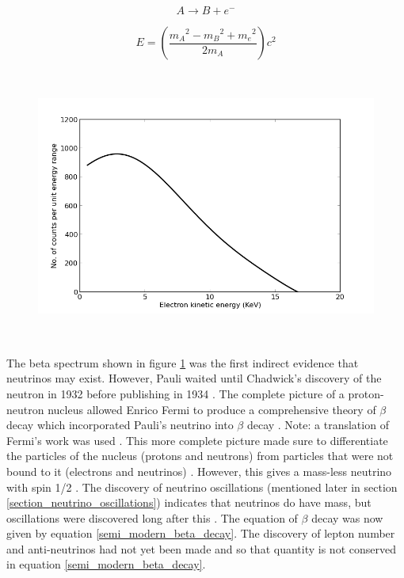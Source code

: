 \begin{equation}
    A \rightarrow B + e^-
    \label{oldBetaDecay}
\end{equation}

\begin{equation}
    E = \left( \frac{{m_A}^2 - {m_B}^2 + {m_e}^2}{2m_A}\right) c^2
    \label{constant_ke_e_equation}
\end{equation}

\begin{figure}[htbp]
 \centering
 \includegraphics[height=90mm]{Chapter1/Figs/Raster/beta_spectrum.png}
 \label{fig:beta_spectrum}
\end{figure}

The beta spectrum shown in figure \ref{fig:beta_spectrum} was the first indirect evidence that neutrinos may exist. However, Pauli waited until Chadwick's discovery of the neutron in 1932 \cite{chadwick1932possible} before publishing in 1934 \cite{lederman1970resource}. The complete picture of a proton-neutron nucleus allowed Enrico Fermi to produce a comprehensive theory of $\beta$ decay which incorporated Pauli's neutrino into $\beta$ decay \cite{lederman1970resource} \cite{Fermi:1934hr}. Note: a translation of Fermi's work was used \cite{wilson1968fermi}. This more complete picture made sure to differentiate the particles of the nucleus (protons and neutrons) from particles that were not bound to it (electrons and neutrinos) \cite{Fermi:1934hr} \cite{wilson1968fermi}. However, this gives a mass-less neutrino with spin 1/2 \cite{lederman1970resource}. The discovery of neutrino oscillations (mentioned later in section \ref{section_neutrino_oscillations}) indicates that neutrinos do have mass, but oscillations were discovered long after this \cite{griffiths2008book} \cite{griffiths2008neutrino1.5}. The equation of $\beta$ decay was now given by equation \ref{semi_modern_beta_decay}. The discovery of lepton number and anti-neutrinos had not yet been made and so that quantity is not conserved in equation \ref{semi_modern_beta_decay}. 

